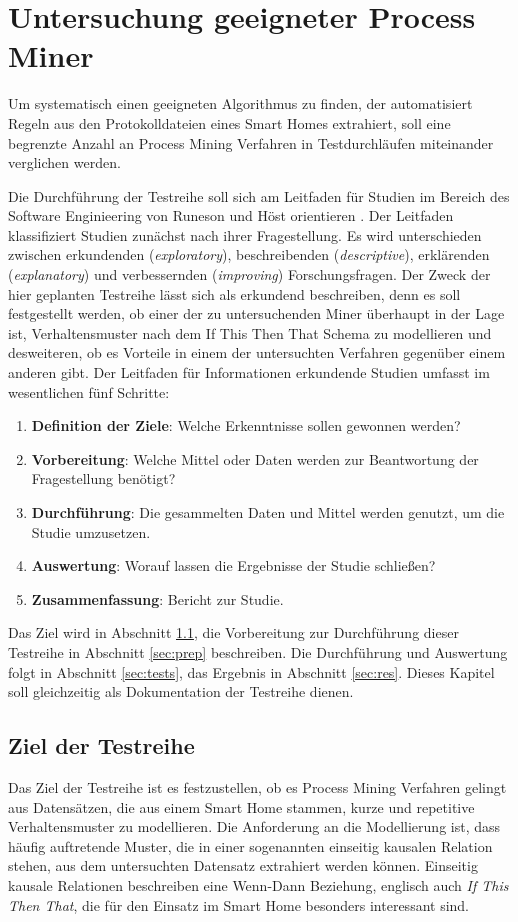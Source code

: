 \chapter{Untersuchung geeigneter Process Miner}\label{chap:approach}
Um systematisch einen geeigneten Algorithmus zu finden, der automatisiert Regeln aus den Protokolldateien eines Smart Homes extrahiert, soll eine begrenzte Anzahl an Process Mining Verfahren in Testdurchläufen miteinander verglichen werden. 

Die Durchführung der Testreihe soll sich am Leitfaden für Studien im Bereich des Software Enginieering von Runeson und Höst orientieren \cite{runh}. Der Leitfaden klassifiziert Studien zunächst nach ihrer Fragestellung. Es wird unterschieden zwischen erkundenden (\textit{exploratory}), beschreibenden (\textit{descriptive}), erklärenden (\textit{explanatory}) und verbessernden (\textit{improving}) Forschungsfragen. Der Zweck der hier geplanten Testreihe lässt sich als erkundend beschreiben, denn es soll festgestellt werden, ob einer der zu untersuchenden Miner überhaupt in der Lage ist, Verhaltensmuster nach dem If This Then That Schema zu modellieren und desweiteren, ob es Vorteile in einem der untersuchten Verfahren gegenüber einem anderen gibt. 
Der Leitfaden für Informationen erkundende Studien umfasst im wesentlichen fünf Schritte: 

\begin{enumerate}
  \item \textbf{Definition der Ziele}: Welche Erkenntnisse sollen gewonnen werden?
  \item \textbf{Vorbereitung}: Welche Mittel oder Daten werden zur Beantwortung der Fragestellung benötigt?
  \item \textbf{Durchführung}: Die gesammelten Daten und Mittel werden genutzt, um die Studie umzusetzen. 
  \item \textbf{Auswertung}: Worauf lassen die Ergebnisse der Studie schließen?
  \item \textbf{Zusammenfassung}: Bericht zur Studie.
\end{enumerate}

Das Ziel wird in Abschnitt \ref{sec:def}, die Vorbereitung zur Durchführung dieser Testreihe  in Abschnitt \ref{sec:prep} beschreiben. Die Durchführung und Auswertung folgt in Abschnitt  \ref{sec:tests}, das Ergebnis in Abschnitt \ref{sec:res}. Dieses Kapitel soll gleichzeitig als Dokumentation der Testreihe dienen.

\section{Ziel der Testreihe}\label{sec:def}
Das Ziel der Testreihe ist es festzustellen, ob es Process Mining Verfahren gelingt aus Datensätzen, die aus einem Smart Home stammen, kurze und repetitive Verhaltensmuster zu modellieren. Die Anforderung an die Modellierung ist, dass häufig auftretende Muster, die in einer sogenannten einseitig kausalen Relation stehen, aus dem untersuchten Datensatz extrahiert werden können. Einseitig kausale Relationen beschreiben eine Wenn-Dann Beziehung, englisch auch \textit{If This Then That}, die für den Einsatz im Smart Home besonders interessant sind. 

